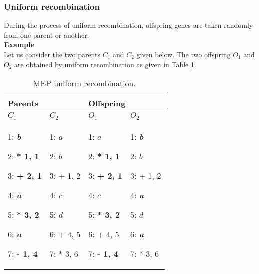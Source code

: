 \documentclass [11pt]{article}
\begin{document}
\subsubsection{Uniform recombination}

During the process of uniform recombination, offspring genes are taken 
randomly from one parent or another.\\


\textbf{Example}\\

Let us consider the two parents $C_{1}$ and $C_{2}$ given below. The two 
offspring $O_{1}$ and $O_{2}$ are obtained by uniform recombination as 
given in Table \ref{mep_uniform}.



\begin{table}[htbp]
\caption{MEP uniform recombination.}
\label{mep_uniform}
\begin{center}
\begin{tabular}
{p{55pt}p{49pt}p{49pt}p{49pt}}
\hline
\multicolumn{2}{p{104pt}}{Parents } & 
\multicolumn{2}{p{98pt}}{Offspring}  \\
\hline
$C_{1}$& 
$C_{2}$& 
$O_{1}$& 
$O_{2}$ \\
\hline
1: \textbf{\textit{b}} \par 2: \textbf{* 1, 1} \par 3: \textbf{+ 2, 1} \par 4: \textbf{\textit{a}} \par 5: \textbf{* 3, 2} \par 6: \textbf{\textit{a}} \par 7: \textbf{- 1, 4}& 
1: $a$ \par 2: $b$ \par 3: + 1, 2 \par 4: $c$ \par 5: $d$ \par 6: + 4, 5 \par 7: * 3, 6& 
1: $a$ \par 2: \textbf{* 1, 1} \par 3: \textbf{+ 2, 1} \par 4: $c$ \par 5: \textbf{* 3, 2} \par 6: + 4, 5 \par 7: \textbf{- 1, 4}& 
1: \textbf{\textit{b}} \par 2: $b$ \par 3: + 1, 2 \par 4: \textbf{\textit{a}} \par 5: $d$ \par 6: \textbf{\textit{a}} \par 7: * 3, 6 \\
\hline
\end{tabular}
\end{center}
\end{table}
\end{document}
